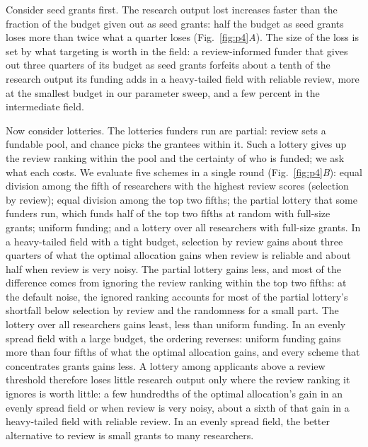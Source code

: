 \documentclass[9pt,twocolumn,twoside]{pnas-new}
\begin{document}
Consider seed grants first. The research output lost increases faster than the fraction of the budget given out as seed grants: half the budget as seed grants loses more than twice what a quarter loses (Fig.~\ref{fig:p4}\textit{A}). The size of the loss is set by what targeting is worth in the field: a review-informed funder that gives out three quarters of its budget as seed grants forfeits about a tenth of the research output its funding adds in a heavy-tailed field with reliable review, more at the smallest budget in our parameter sweep, and a few percent in the intermediate field.

Now consider lotteries. The lotteries funders run are partial: review sets a fundable pool, and chance picks the grantees within it. Such a lottery gives up the review ranking within the pool and the certainty of who is funded; we ask what each costs. We evaluate five schemes in a single round (Fig.~\ref{fig:p4}\textit{B}): equal division among the fifth of researchers with the highest review scores (selection by review); equal division among the top two fifths; the partial lottery that some funders run, which funds half of the top two fifths at random with full-size grants; uniform funding; and a lottery over all researchers with full-size grants. In a heavy-tailed field with a tight budget, selection by review gains about three quarters of what the optimal allocation gains when review is reliable and about half when review is very noisy. The partial lottery gains less, and most of the difference comes from ignoring the review ranking within the top two fifths: at the default noise, the ignored ranking accounts for most of the partial lottery's shortfall below selection by review and the randomness for a small part. The lottery over all researchers gains least, less than uniform funding. In an evenly spread field with a large budget, the ordering reverses: uniform funding gains more than four fifths of what the optimal allocation gains, and every scheme that concentrates grants gains less. A lottery among applicants above a review threshold therefore loses little research output only where the review ranking it ignores is worth little: a few hundredths of the optimal allocation's gain in an evenly spread field or when review is very noisy, about a sixth of that gain in a heavy-tailed field with reliable review. In an evenly spread field, the better alternative to review is small grants to many researchers.
\end{document}
